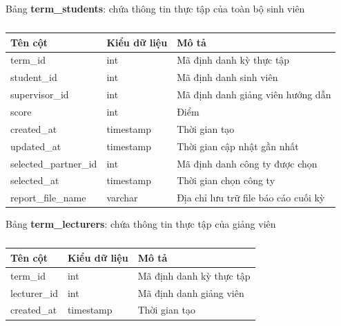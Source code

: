 \documentclass[./../main.tex]{subfiles}
\begin{document}
Bảng \textbf{term\_students}: chứa thông tin thực tập của toàn bộ sinh viên

\begin{table}[H]
	\caption{}
	\label{tab:db_term_students}
	\begin{tabular}{|l|l|l|}
	\hline
	\textbf{Tên cột}      & \textbf{Kiểu dữ liệu} & \textbf{Mô tả}                       \\ \hline
	term\_id              & int                   & Mã định danh kỳ thực tập             \\ \hline
	student\_id           & int                   & Mã định danh sinh viên               \\ \hline
	supervisor\_id        & int                   & Mã định danh giảng viên hướng dẫn    \\ \hline
	score                 & int                   & Điểm                                 \\ \hline
	created\_at           & timestamp             & Thời gian tạo                        \\ \hline
	updated\_at           & timestamp             & Thời gian cập nhật gần nhất          \\ \hline
	selected\_partner\_id & int                   & Mã định danh công ty được chọn       \\ \hline
	selected\_at          & timestamp             & Thời gian chọn công ty               \\ \hline
	report\_file\_name    & varchar               & Địa chỉ lưu trữ file báo cáo cuối kỳ \\ \hline
	\end{tabular}
\end{table}

Bảng \textbf{term\_lecturers}: chứa thông tin thực tập của giảng viên

\begin{table}[H]
	\caption{}
	\label{tab:db_term_lecturers}
	\begin{tabular}{|l|l|l|}
	\hline
	\textbf{Tên cột} & \textbf{Kiểu dữ liệu} & \textbf{Mô tả}           \\ \hline
	term\_id         & int                   & Mã định danh kỳ thực tập \\ \hline
	lecturer\_id     & int                   & Mã định danh giảng viên  \\ \hline
	created\_at      & timestamp             & Thời gian tạo            \\ \hline
	\end{tabular}
\end{table}
\end{document}
